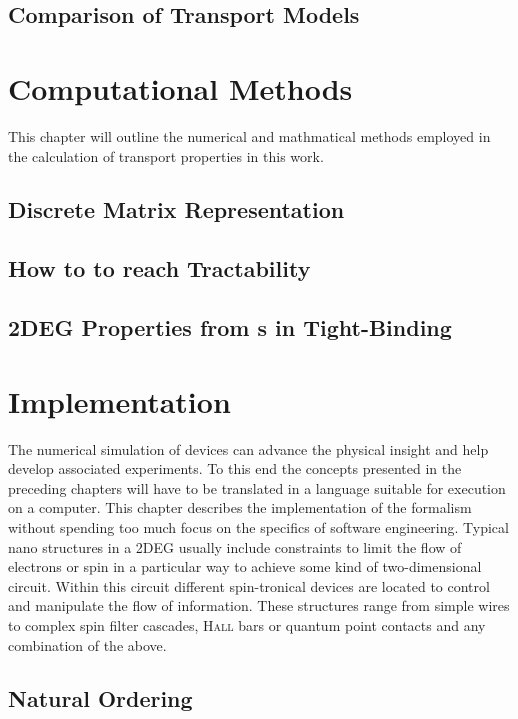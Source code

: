   \section{Comparison of Transport Models}
  
\chapter{Computational Methods}
This chapter will outline the numerical and mathmatical methods employed in the calculation of transport properties in this work.
  \section{Discrete Matrix Representation}\label{sec:discretematrixrep}
  
  \section{How to to reach Tractability}\label{sec:tractability}
  
  \section{2DEG Properties from \cgfnc s in Tight-Binding}\label{sec:observables}
  
\chapter{Implementation}
The numerical simulation of devices can advance the physical insight and help develop associated experiments. To this end the concepts presented in the preceding chapters will have to be translated in a language suitable for execution on a computer. This chapter describes the implementation of the \gfnc{} formalism without spending too much focus on the specifics of software engineering.
Typical nano structures in a 2DEG usually include constraints to limit the flow of electrons or spin in a particular way to achieve some kind of two-dimensional circuit. Within this circuit different spin-tronical devices are located to control and manipulate the flow of information. These structures range from simple wires to complex spin filter cascades, \textsc{Hall} bars or quantum point contacts and any combination of the above.
\section{Natural Ordering}\label{sec:naruralordering}

